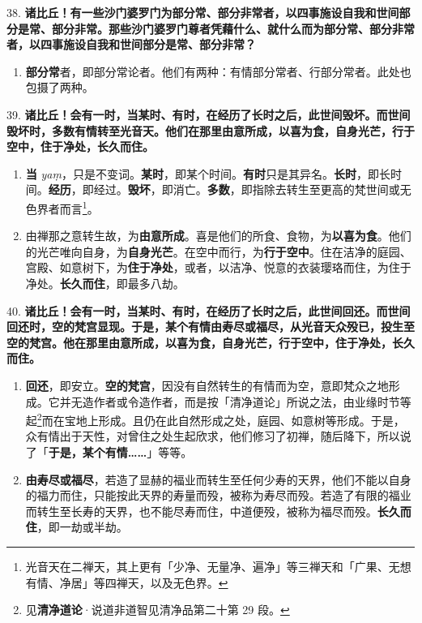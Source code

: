 {\Large 38.} \textbf{诸比丘！有一些沙门婆罗门为部分常、部分非常者，以四事施设自我和世间部分是常、部分非常。那些沙门婆罗门尊者凭藉什么、就什么而为部分常、部分非常者，以四事施设自我和世间部分是常、部分非常？}

\begin{enumerate}\item \textbf{部分常}者，即部分常论者。他们有两种：有情部分常者、行部分常者。此处也包摄了两种。\end{enumerate}

{\Large 39.} \textbf{诸比丘！会有一时，当某时、有时，在经历了长时之后，此世间毁坏。而世间毁坏时，多数有情转至光音天。他们在那里由意所成，以喜为食，自身光芒，行于空中，住于净处，长久而住。}

\begin{enumerate}\item \textbf{当} \textit{yaṃ}，只是不变词。\textbf{某时}，即某个时间。\textbf{有时}只是其异名。\textbf{长时}，即长时间。\textbf{经历}，即经过。\textbf{毁坏}，即消亡。\textbf{多数}，即指除去转生至更高的梵世间或无色界者而言\footnote{光音天在二禅天，其上更有「少净、无量净、遍净」等三禅天和「广果、无想有情、净居」等四禅天，以及无色界。}。
\item 由禅那之意转生故，为\textbf{由意所成}。喜是他们的所食、食物，为\textbf{以喜为食}。他们的光芒唯向自身，为\textbf{自身光芒}。在空中而行，为\textbf{行于空中}。住在洁净的庭园、宫殿、如意树下，为\textbf{住于净处}，或者，以洁净、悦意的衣装璎珞而住，为住于净处。\textbf{长久而住}，即最多八劫。\end{enumerate}

{\Large 40.} \textbf{诸比丘！会有一时，当某时、有时，在经历了长时之后，此世间回还。而世间回还时，空的梵宫显现。于是，某个有情由寿尽或福尽，从光音天众殁已，投生至空的梵宫。他在那里由意所成，以喜为食，自身光芒，行于空中，住于净处，长久而住。}

\begin{enumerate}\item \textbf{回还}，即安立。\textbf{空的梵宫}，因没有自然转生的有情而为空，意即梵众之地形成。它并无造作者或令造作者，而是按「清净道论」所说之法，由业缘时节等起\footnote{见\textbf{清净道论}·说道非道智见清净品第二十第 29 段。}而在宝地上形成。且仍在此自然形成之处，庭园、如意树等形成。于是，众有情出于天性，对曾住之处生起欣求，他们修习了初禅，随后降下，所以说了「\textbf{于是，某个有情……}」等等。
\item \textbf{由寿尽或福尽}，若造了显赫的福业而转生至任何少寿的天界，他们不能以自身的福力而住，只能按此天界的寿量而殁，被称为寿尽而殁。若造了有限的福业而转生至长寿的天界，也不能尽寿而住，中道便殁，被称为福尽而殁。\textbf{长久而住}，即一劫或半劫。\end{enumerate}

